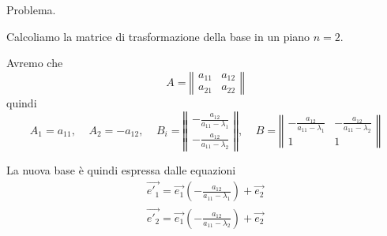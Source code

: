 Problema.

Calcoliamo la matrice di trasformazione della base in un piano $n=2$.

Avremo che
\begin{displaymath}
  A=
  \left\Vert
  \begin{array}{ll}
    a_{11}&a_{12}
    \\
    a_{21}&a_{22}
  \end{array}
  \right\Vert
\end{displaymath}
quindi
\begin{displaymath}
  A_1=a_{11}
  ,\;\;\;\;
  A_2=-a_{12}
  ,\;\;\;\;
  B_i=
  \left\Vert
  \begin{array}{l}
    -\frac{a_{12}}{a_{11} - \lambda_1}
    \\
    -\frac{a_{12}}{a_{11} - \lambda_2}
  \end{array}
  \right\Vert
  ,\;\;\;\;
  B=
  \left\Vert
  \begin{array}{ll}
    -\frac{a_{12}}{a_{11} - \lambda_1}&-\frac{a_{12}}{a_{11} - \lambda_2}
    \\
    1&1
  \end{array}
  \right\Vert
\end{displaymath}

La nuova base \`e quindi espressa dalle equazioni
\begin{displaymath}
  \begin{array}{l}
    \vec{e'_1}=\vec{e_1}\left(-\frac{a_{12}}{a_{11}-\lambda_1}\right)
    +\vec{e_2}
    \\
    \vec{e'_2}=\vec{e_1}\left(-\frac{a_{12}}{a_{11}-\lambda_2}\right)
    +\vec{e_2}
  \end{array}
\end{displaymath}

